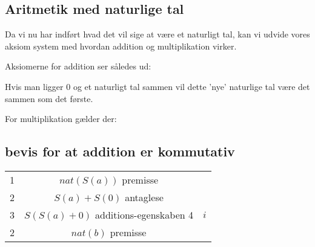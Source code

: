 \subsection*{Aritmetik med naturlige tal}
Da vi nu har indført hvad det vil sige at være et naturligt tal,
kan vi udvide vores aksiom system med hvordan addition og multiplikation virker.

Aksiomerne for addition ser således ud:

\begin{prooftree}
\end{prooftree}
Hvis man ligger 0 og et naturligt tal sammen vil dette 'nye' naturlige tal være det sammen som det første.

\begin{prooftree}
\end{prooftree}


For multiplikation gælder der:
\begin{prooftree}
\end{prooftree}

\begin{prooftree}
\end{prooftree}

\subsection*{bevis for at addition er kommutativ}

\begin{tabular}{l c r}
    1 & $nat(S(a))$ premisse \\
    2 & $S(a) + S(0)$ antaglese \\
    3 & $S(S(a) + 0)$ additions-egenskaben
    4 & $i$ \\
    2 & $nat(b)$ premisse \\

\end{tabular}
